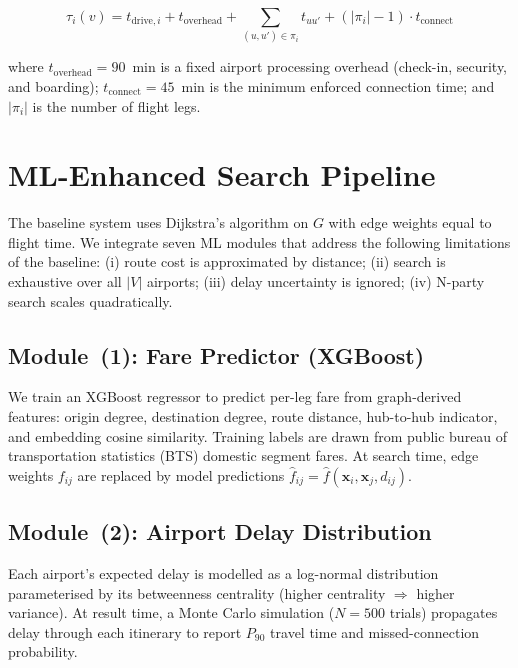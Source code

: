 \documentclass[review]{elsarticle}
\begin{document}
\begin{equation}
    \tau_i(v) = t_{\text{drive},i} + t_{\text{overhead}} + \sum_{(u,u') \in \pi_i} t_{uu'} + (|\pi_i| - 1) \cdot t_{\text{connect}}
\end{equation}

\noindent where $t_{\text{overhead}} = 90$~min is a fixed airport processing overhead (check-in, security, and boarding); $t_{\text{connect}} = 45$~min is the minimum enforced connection time; and $|\pi_i|$ is the number of flight legs.

\section{ML-Enhanced Search Pipeline}
\label{sec:ml}

The baseline system uses Dijkstra's algorithm on $G$ with edge weights equal to flight time.
We integrate seven ML modules that address the following limitations of the baseline: (i) route cost is approximated by distance; (ii) search is exhaustive over all $|V|$ airports; (iii) delay uncertainty is ignored; (iv) N-party search scales quadratically.

\subsection{Module~(1): Fare Predictor (XGBoost)}

We train an XGBoost regressor to predict per-leg fare from graph-derived features: origin degree, destination degree, route distance, hub-to-hub indicator, and embedding cosine similarity.
Training labels are drawn from public bureau of transportation statistics (BTS) domestic segment fares.
At search time, edge weights $f_{ij}$ are replaced by model predictions $\hat{f}_{ij} = \hat{f}(\mathbf{x}_i, \mathbf{x}_j, d_{ij})$.

\subsection{Module~(2): Airport Delay Distribution}

Each airport's expected delay is modelled as a log-normal distribution parameterised by its betweenness centrality \cite{brandes2001} (higher centrality $\Rightarrow$ higher variance).
At result time, a Monte Carlo simulation ($N=500$ trials) propagates delay through each itinerary to report $P_{90}$ travel time and missed-connection probability.
\end{document}
